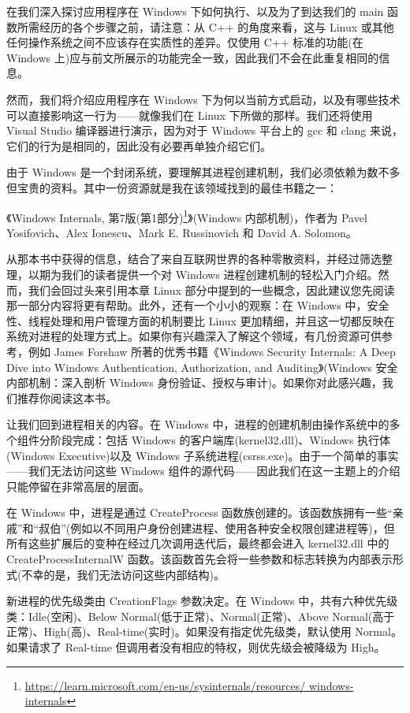 
在我们深入探讨应用程序在 Windows 下如何执行、以及为了到达我们的 main 函数所需经历的各个步骤之前，请注意：从 C++ 的角度来看，这与 Linux 或其他任何操作系统之间不应该存在实质性的差异。仅使用 C++ 标准的功能(在 Windows 上)应与前文所展示的功能完全一致，因此我们不会在此重复相同的信息。

然而，我们将介绍应用程序在 Windows 下为何以当前方式启动，以及有哪些技术可以直接影响这一行为——就像我们在 Linux 下所做的那样。我们还将使用 Visual Studio 编译器进行演示，因为对于 Windows 平台上的 gcc 和 clang 来说，它们的行为是相同的，因此没有必要再单独介绍它们。

由于 Windows 是一个封闭系统，要理解其进程创建机制，我们必须依赖为数不多但宝贵的资料。其中一份资源就是我在该领域找到的最佳书籍之一：

《Windows Internals, 第7版(第1部分)\footnote{\url{https://learn.microsoft.com/en-us/sysinternals/resources/
windows-internals}}》(Windows 内部机制)，作者为 Pavel Yosifovich、Alex Ionescu、Mark E. Russinovich 和 David A. Solomon。

从那本书中获得的信息，结合了来自互联网世界的各种零散资料，并经过筛选整理，以期为我们的读者提供一个对 Windows 进程创建机制的轻松入门介绍。然而，我们会回过头来引用本章 Linux 部分中提到的一些概念，因此建议您先阅读那一部分内容将更有帮助。此外，还有一个小小的观察：在 Windows 中，安全性、线程处理和用户管理方面的机制要比 Linux 更加精细，并且这一切都反映在系统对进程的处理方式上。如果你有兴趣深入了解这个领域，有几份资源可供参考，例如 James Forshaw 所著的优秀书籍《Windows Security Internals: A Deep Dive into Windows Authentication, Authorization, and Auditing》(Windows 安全内部机制：深入剖析 Windows 身份验证、授权与审计)。如果你对此感兴趣，我们推荐你阅读这本书。

让我们回到进程相关的内容。在 Windows 中，进程的创建机制由操作系统中的多个组件分阶段完成：包括 Windows 的客户端库(kernel32.dll)、Windows 执行体(Windows Executive)以及 Windows 子系统进程(csrss.exe)。由于一个简单的事实——我们无法访问这些 Windows 组件的源代码——因此我们在这一主题上的介绍只能停留在非常高层的层面。

在 Windows 中，进程是通过 CreateProcess 函数族创建的。该函数族拥有一些“亲戚”和“叔伯”(例如以不同用户身份创建进程、使用各种安全权限创建进程等)，但所有这些扩展后的变种在经过几次调用迭代后，最终都会进入 kernel32.dll 中的 CreateProcessInternalW 函数。该函数首先会将一些参数和标志转换为内部表示形式(不幸的是，我们无法访问这些内部结构)。

新进程的优先级类由 CreationFlags 参数决定。在 Windows 中，共有六种优先级类：Idle(空闲)、Below Normal(低于正常)、Normal(正常)、Above Normal(高于正常)、High(高)、Real-time(实时)。如果没有指定优先级类，默认使用 Normal。如果请求了 Real-time 但调用者没有相应的特权，则优先级会被降级为 High。

